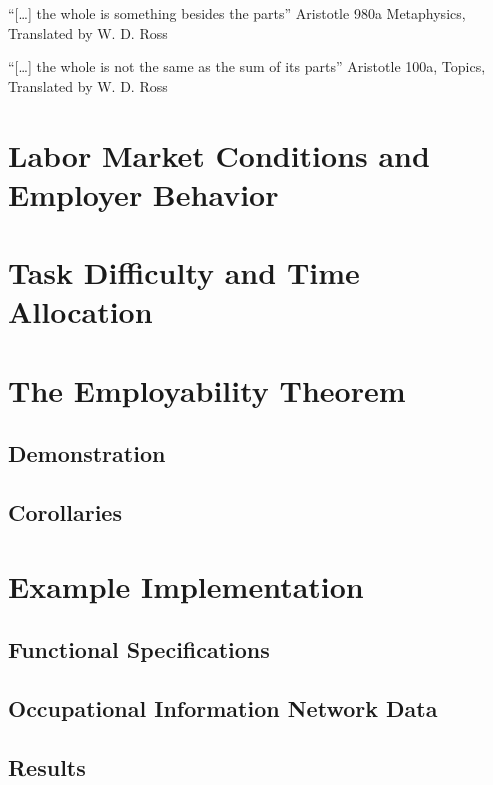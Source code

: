 \documentclass[hidelinks, nonatbib]{elsarticle}
\begin{document}
``[\dots] the whole is something besides the parts''
Aristotle 980a Metaphysics, Translated by W. D. Ross 

``[\dots] the whole is not the same as the sum of its parts''
Aristotle 100a, Topics, Translated by W. D. Ross

\ORA
\OCA
\OCL

\section{Labor Market Conditions and Employer Behavior}
\RA
\HA
\OEL
\LMCA

\section{Task Difficulty and Time Allocation}
\TDA


\section{The Employability Theorem}
\subsection{Demonstration}
\PET

\subsection{Corollaries}
\AEC

\OCC

\ACC


\section{Example Implementation}
\subsection{Functional Specifications}
\subsection{Occupational Information Network Data}
\subsection{Results}
\end{document}
